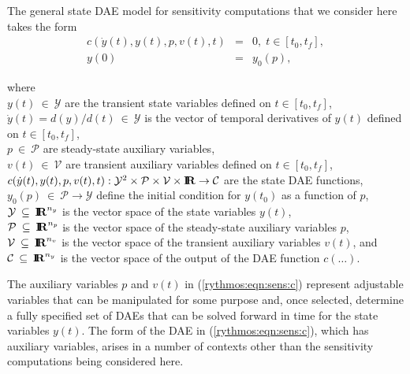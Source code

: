 \documentclass[pdf,ps2pdf,11pt]{SANDreport}
\begin{document}
The general state DAE model for sensitivity computations that we
consider here takes the form
%
\begin{eqnarray}
c\left( \dot{y}(t), y(t), p, v(t), t \right) & = & 0,
\; t \in \left[ t_0, t_f \right], \label{rythmos:eqn:sens:c} \\
y(0) & = & y_0(p), \label{rythmos:eqn:sens:c:ic}
\end{eqnarray}
\begin{tabbing}
\hspace{4ex}where\hspace{1ex}\= \\
\>	$y(t) \:\in\:\mathcal{Y}$ are the transient state variables defined on $t\in[t_0,t_f]$, \\
\>	$\dot{y}(t) = d(y)/d(t)\:\in\:\mathcal{Y}$ is the vector of temporal derivatives of $y(t)$ defined on $t\in[t_0,t_f]$, \\
\>	$p \:\in\:\mathcal{P}$ are steady-state auxiliary variables, \\
\>	$v(t) \:\in\:\mathcal{V}$ are transient auxiliary variables defined on $t\in[t_0,t_f]$, \\
\>	$c(\dot{y}(t), y(t), p, v(t), t) :
		\mathcal{Y}^2 \times \mathcal{P} \times \mathcal{V} \times \mbox{\textbf{I}}\hspace{-0.6ex}\mbox{\textbf{R}}
		\rightarrow \mathcal{C}$ are the state DAE functions, \\
\>	$y_0(p) \:\in\:\mathcal{P} \rightarrow \mathcal{Y}$ define the initial condition for $y(t_0)$ as a function of $p$, \\
\>	$\mathcal{Y} \:\subseteq\:\mbox{\textbf{I}}\hspace{-0.6ex}\mbox{\textbf{R}}^{n_y}$ is the vector space of the state variables $y(t)$, \\
\>	$\mathcal{P} \:\subseteq\:\mbox{\textbf{I}}\hspace{-0.6ex}\mbox{\textbf{R}}^{n_p}$ is the vector space of the steady-state auxiliary variables $p$, \\
\>	$\mathcal{V} \:\subseteq\:\mbox{\textbf{I}}\hspace{-0.6ex}\mbox{\textbf{R}}^{n_v}$ is the vector space of the transient auxiliary variables $v(t)$, and \\
\>	$\mathcal{C} \:\subseteq\:\mbox{\textbf{I}}\hspace{-0.6ex}\mbox{\textbf{R}}^{n_y}$ is the vector space of the output of the DAE function $c(\ldots)$.
\end{tabbing}

The auxiliary variables $p$ and $v(t)$ in (\ref{rythmos:eqn:sens:c}) represent
adjustable variables that can be manipulated for some purpose and, once
selected, determine a fully specified set of DAEs that can be solved forward
in time for the state variables $y(t)$.  The form of the DAE in
(\ref{rythmos:eqn:sens:c}), which has auxiliary variables, arises in a number
of contexts other than the sensitivity computations being considered here.
\end{document}
